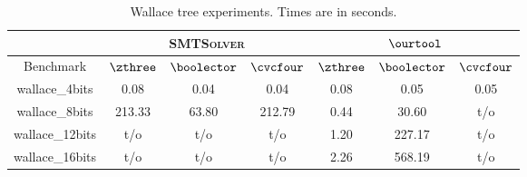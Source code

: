 \begin{table}[t]
\centering
\caption{Wallace tree experiments. Times are in seconds.}
\label{my-label}
\begin{tabular}{|c|c|c|c|c|c|c|}
\hline
                & \multicolumn{3}{c|}{\textsc{SMTSolver}}       & \multicolumn{3}{c|}{$\ourtool$}       \\ \hline
Benchmark       & $\zthree$ & $\boolector$ & $\cvcfour$ & $\zthree$ & $\boolector$ & $\cvcfour$ \\ \hline
wallace\_4bits  & 0.08     & 0.04        & 0.04      & 0.08     & 0.05        & 0.05      \\ \hline
wallace\_8bits  & 213.33  & 63.80      & 212.79   & 0.44     & 30.60       & t/o        \\ \hline
wallace\_12bits & t/o       & t/o          & t/o        & 1.20     & 227.17     & t/o        \\ \hline
wallace\_16bits & t/o       & t/o          & t/o        & 2.26     & 568.19    & t/o        \\ \hline
\end{tabular}
\end{table}


